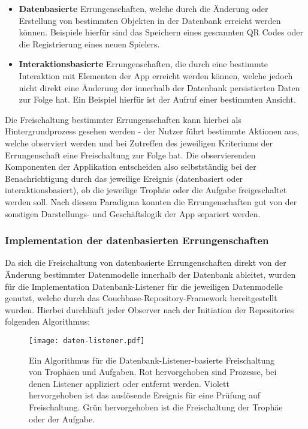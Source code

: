 \begin{itemize}
    \item \textbf{Datenbasierte} Errungenschaften, welche durch die Änderung oder Erstellung von bestimmten Objekten in der Datenbank erreicht werden können. Beispiele hierfür sind das Speichern eines gescannten QR Codes oder die Registrierung eines neuen Spielers.
    \item \textbf{Interaktionsbasierte} Errungenschaften, die durch eine bestimmte Interaktion mit Elementen der App erreicht werden können, welche jedoch nicht direkt eine Änderung der innerhalb der Datenbank persistierten Daten zur Folge hat. Ein Beispiel hierfür ist der Aufruf einer bestimmten Ansicht.
\end{itemize}

\noindent Die Freischaltung bestimmter Errungenschaften kann hierbei als Hintergrundprozess gesehen werden - der Nutzer führt bestimmte Aktionen aus, welche observiert werden und bei Zutreffen des jeweiligen Kriteriums der Errungenschaft eine Freischaltung zur Folge hat. Die observierenden Komponenten der Applikation entscheiden also selbstständig bei der Benachrichtigung durch das jeweilige Ereignis (datenbasiert oder interaktionsbasiert), ob die jeweilige Trophäe oder die Aufgabe freigeschaltet werden soll. Nach diesem Paradigma konnten die Errungenschaften gut von der sonstigen Darstellungs- und Geschäftslogik der App separiert werden.

\subsubsection{Implementation der datenbasierten Errungenschaften}

Da sich die Freischaltung von datenbasierte Errungenschaften direkt von der Änderung bestimmter Datenmodelle innerhalb der Datenbank ableitet, wurden für die Implementation Datenbank-Listener für die jeweiligen Datenmodelle genutzt, welche durch das Couchbase-Repository-Framework bereitgestellt wurden. Hierbei durchläuft jeder Observer nach der Initiation der Repositories folgenden Algorithmus:

\begin{figure}[H]
\texttt{[image: daten-listener.pdf]}
\caption{Ein Algorithmus für die Datenbank-Listener-basierte Freischaltung von Trophäen und Aufgaben. Rot hervorgehoben sind Prozesse, bei denen Listener appliziert oder entfernt werden. Violett hervorgehoben ist das auslösende Ereignis für eine Prüfung auf Freischaltung. Grün hervorgehoben ist die Freischaltung der Trophäe oder der Aufgabe.}\label{fig:daten-listener}
\end{figure}

